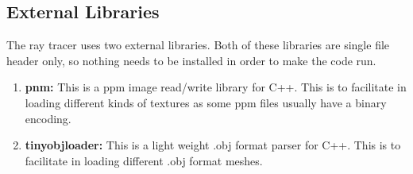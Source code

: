\documentclass[11pt,a4paper]{article}
\begin{document}
	\subsection{External Libraries}
	The ray tracer uses two external libraries. Both of these libraries are single file header only, so nothing needs to be installed in order to make the code run.
	\begin{enumerate}
		\item \textbf{pnm:} This is a ppm image read/write library for C++. This is to facilitate in loading different kinds of textures as some ppm files usually have a binary encoding.
		\item \textbf{tinyobjloader:} This is a light weight .obj format parser for C++. This is to facilitate in loading different .obj format meshes.
	\end{enumerate}
\end{document}
